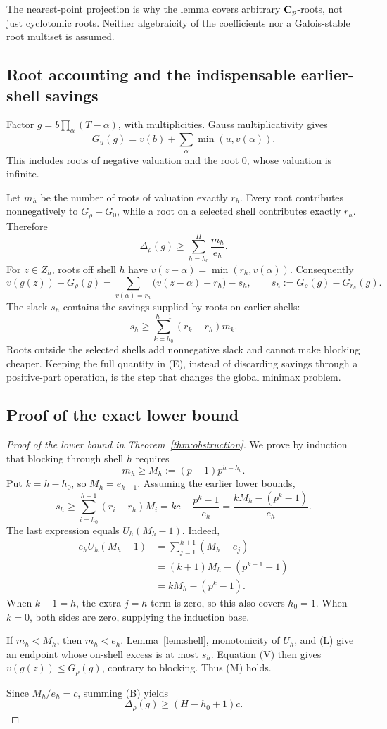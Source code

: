 The nearest-point projection is why the lemma covers arbitrary \(\mathbf C_p\)-roots, not just cyclotomic roots. Neither algebraicity of the coefficients nor a Galois-stable root multiset is assumed.

\subsection{Root accounting and the indispensable earlier-shell savings}
Factor
\(g=b\prod_\alpha(T-\alpha)\), with multiplicities. Gauss multiplicativity gives
\[
 G_u(g)=v(b)+\sum_\alpha\min(u,v(\alpha)).
 \tag{G}
\]
This includes roots of negative valuation and the root \(0\), whose valuation is infinite.

Let \(m_h\) be the number of roots of valuation exactly \(r_h\). Every root contributes nonnegatively to \(G_\rho-G_0\), while a root on a selected shell contributes exactly \(r_h\). Therefore
\[
 \Delta_\rho(g)\ge\sum_{h=h_0}^H\frac{m_h}{e_h}.
 \tag{B}
\]
For \(z\in Z_h\), roots off shell \(h\) have
\(v(z-\alpha)=\min(r_h,v(\alpha))\). Consequently
\[
 v(g(z))-G_\rho(g)
 =
 \sum_{v(\alpha)=r_h}\bigl(v(z-\alpha)-r_h\bigr)-s_h,
 \qquad
 s_h:=G_\rho(g)-G_{r_h}(g).
 \tag{V}
\]
The slack \(s_h\) contains the savings supplied by roots on earlier shells:
\[
 s_h\ge
 \sum_{k=h_0}^{h-1}(r_k-r_h)m_k.
 \tag{E}
\]
Roots outside the selected shells add nonnegative slack and cannot make blocking cheaper. Keeping the full quantity in (E), instead of discarding savings through a positive-part operation, is the step that changes the global minimax problem.

\subsection{Proof of the exact lower bound}
\begin{proof}[Proof of the lower bound in Theorem~\ref{thm:obstruction}]
We prove by induction that blocking through shell \(h\) requires
\[
 m_h\ge M_h:=(p-1)p^{h-h_0}.
 \tag{M}
\]
Put \(k=h-h_0\), so \(M_h=e_{k+1}\). Assuming the earlier lower bounds,
\[
 s_h\ge
 \sum_{i=h_0}^{h-1}(r_i-r_h)M_i
 =kc-\frac{p^k-1}{e_h}
 =\frac{kM_h-(p^k-1)}{e_h}.
 \tag{L}
\]
The last expression equals \(U_h(M_h-1)\). Indeed,
\begin{align*}
 e_hU_h(M_h-1)
 &=\sum_{j=1}^{k+1}(M_h-e_j)\\
 &=(k+1)M_h-(p^{k+1}-1)\\
 &=kM_h-(p^k-1).
\end{align*}
When \(k+1=h\), the extra \(j=h\) term is zero, so this also covers \(h_0=1\). When \(k=0\), both sides are zero, supplying the induction base.

If \(m_h<M_h\), then \(m_h<e_h\). Lemma~\ref{lem:shell}, monotonicity of \(U_h\), and (L) give an endpoint whose on-shell excess is at most \(s_h\). Equation (V) then gives \(v(g(z))\le G_\rho(g)\), contrary to blocking. Thus (M) holds.

Since \(M_h/e_h=c\), summing (B) yields
\[
 \Delta_\rho(g)\ge(H-h_0+1)c.
\]
\end{proof}


